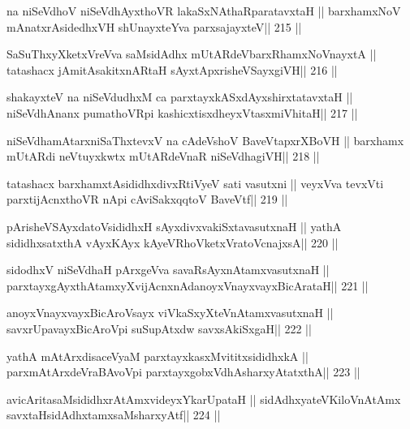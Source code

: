 \begin{shl}
na niSeVdhoV niSeVdhAyxthoVR lakaSxNAthaRparatavxtaH ||
barxhamxNoV mAnatxrAsidedhxVH shUnayxteYva parxsajayxteV\hfill || 215 ||
\end{shl}

\begin{shl}
SaSuThxyXketxVreVva saMsidAdhx mUtARdeVbarxRhamxNoV\s nayxtA ||
tatashacx jAmitAsakitxnARtaH sAyxtApxrisheVSayxgiVH\hfill || 216 ||
\end{shl}

\begin{shl}
shakayxteV na niSeVdudhxM ca parxtayxkASxdAyxshirxtatavxtaH ||
niSeVdhAnanx pumathoVR\s pi kashicxtisxdheyxVtasxmiVhitaH\hfill || 217 ||
\end{shl}

\begin{shl}
niSeVdhamAtarxniSaThxtevxV na cA\s\s deVshoV BaveVtapxrXBoVH ||
barxhamx mUtARdi neVtuyxkwtx mUtARdeVnaR niSeVdhagiVH\hfill || 218 ||
\end{shl}

\begin{shl}
tatashacx barxhamxtAsididhxdivxRtiVyeV sati vasutxni ||
veyxVva tevxVti parxtijAcnxthoVR nApi cA\s\s viSakxqqtoV BaveVtf\hfill || 219 ||
\end{shl}

\begin{shl}
pArisheVSAyxdatoV\s sididhxH sAyxdivxvakiSxtavasutxnaH ||
yathA sididhxsatxthA vAyxKAyx kAyeVRhoVketxVratoV\s cnajxsA\hfill || 220 ||
\end{shl}

\begin{shl}
sidodhxV niSeVdhaH pArxgeVva savaRsAyxnAtamxvasutxnaH ||
parxtayxgAyxthAtamxyXvijAcnxnAdanoyxVnayxvayxBicArataH\hfill || 221 ||
\end{shl}

\begin{shl}
anoyxVnayxvayxBicAroV\s sayx viVkaSxyXteV\s nAtamxvasutxnaH ||
savxrUpavayxBicAroV\s pi suSupAtxdw savxsAkiSxgaH\hfill || 222 ||
\end{shl}

\begin{shl}
yathA mAtArxdisaceVyaM parxtayxkasxMvititxsididhxkA ||
parxmAtArxdeVraBAvoV\s pi parxtayxgobxVdhAsharxyAtatxthA\hfill || 223 ||
\end{shl}

\begin{shl}
avicAritasaMsididhxrAtAmxvideyxYkarUpataH ||
sidAdhxyateV\s KiloV\s nAtAmx savxtaHsidAdhxtamxsaMsharxyAtf\hfill || 224 ||
\end{shl}

